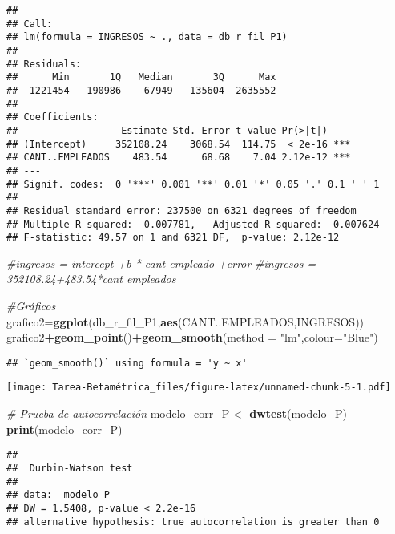 \documentclass[
]{article}
\newenvironment{Shaded}{\begin{snugshade}}{\end{snugshade}}
\newcommand{\AttributeTok}[1]{\textcolor[rgb]{0.13,0.29,0.53}{#1}}
\newcommand{\CommentTok}[1]{\textcolor[rgb]{0.56,0.35,0.01}{\textit{#1}}}
\newcommand{\FunctionTok}[1]{\textcolor[rgb]{0.13,0.29,0.53}{\textbf{#1}}}
\newcommand{\NormalTok}[1]{#1}
\newcommand{\OtherTok}[1]{\textcolor[rgb]{0.56,0.35,0.01}{#1}}
\newcommand{\SpecialCharTok}[1]{\textcolor[rgb]{0.81,0.36,0.00}{\textbf{#1}}}
\newcommand{\StringTok}[1]{\textcolor[rgb]{0.31,0.60,0.02}{#1}}
\begin{document}
\begin{verbatim}
## 
## Call:
## lm(formula = INGRESOS ~ ., data = db_r_fil_P1)
## 
## Residuals:
##      Min       1Q   Median       3Q      Max 
## -1221454  -190986   -67949   135604  2635552 
## 
## Coefficients:
##                  Estimate Std. Error t value Pr(>|t|)    
## (Intercept)     352108.24    3068.54  114.75  < 2e-16 ***
## CANT..EMPLEADOS    483.54      68.68    7.04 2.12e-12 ***
## ---
## Signif. codes:  0 '***' 0.001 '**' 0.01 '*' 0.05 '.' 0.1 ' ' 1
## 
## Residual standard error: 237500 on 6321 degrees of freedom
## Multiple R-squared:  0.007781,   Adjusted R-squared:  0.007624 
## F-statistic: 49.57 on 1 and 6321 DF,  p-value: 2.12e-12
\end{verbatim}

\begin{Shaded}
\begin{Highlighting}[]
\CommentTok{\#ingresos = intercept +b * cant empleado +error}
\CommentTok{\#ingresos = 352108.24+483.54*cant empleados}

\CommentTok{\#Gráficos}
\NormalTok{grafico2}\OtherTok{=}\FunctionTok{ggplot}\NormalTok{(db\_r\_fil\_P1,}\FunctionTok{aes}\NormalTok{(CANT..EMPLEADOS,INGRESOS))}
\NormalTok{grafico2}\SpecialCharTok{+}\FunctionTok{geom\_point}\NormalTok{()}\SpecialCharTok{+}\FunctionTok{geom\_smooth}\NormalTok{(}\AttributeTok{method =} \StringTok{"lm"}\NormalTok{,}\AttributeTok{colour=}\StringTok{"Blue"}\NormalTok{)}
\end{Highlighting}
\end{Shaded}

\begin{verbatim}
## `geom_smooth()` using formula = 'y ~ x'
\end{verbatim}

\texttt{[image: Tarea-Betamétrica\_files/figure-latex/unnamed-chunk-5-1.pdf]}

\begin{Shaded}
\begin{Highlighting}[]
\CommentTok{\# Prueba de autocorrelación}
\NormalTok{modelo\_corr\_P }\OtherTok{\textless{}{-}} \FunctionTok{dwtest}\NormalTok{(modelo\_P) }
\FunctionTok{print}\NormalTok{(modelo\_corr\_P)}
\end{Highlighting}
\end{Shaded}

\begin{verbatim}
## 
##  Durbin-Watson test
## 
## data:  modelo_P
## DW = 1.5408, p-value < 2.2e-16
## alternative hypothesis: true autocorrelation is greater than 0
\end{verbatim}
\end{document}
